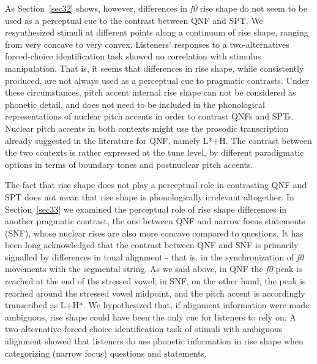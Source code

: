 As Section~\ref{sec32} shows, however, differences in \textit{f0} rise shape do not seem to be used as a perceptual cue to the contrast between QNF and SPT. We resynthesized stimuli at different points along a continuum of rise shape, ranging from very concave to very convex. Listeners' responses to a two-alternatives forced-choice identification task showed no correlation with stimulus manipulation. That is, it seems that differences in rise shape, while consistently produced, are not always used as a perceptual cue to pragmatic contrasts. Under these circumstances, pitch accent internal rise shape can not be considered as phonetic detail, and does not need to be included in the phonological representations of nuclear pitch accents in order to contrast QNFs and SPTs. Nuclear pitch accents in both contexts might use the prosodic transcription already suggested in the literature for QNF, namely L*+H. The contrast between the two contexts is rather expressed at the tune level, by different paradigmatic options in terms of boundary tones and postnuclear pitch accents.

The fact that rise shape does not play a perceptual role in contrasting QNF and SPT does not mean that rise shape is phonologically irrelevant altogether. In Section~\ref{sec33} we examined the perceptual role of rise shape differences in another pragmatic contrast, the one between QNF and narrow focus statements (SNF), whose nuclear rises are also more concave compared to questions. It has been long acknowledged that the contrast between QNF and SNF is primarily signalled by differences in tonal alignment - that is, in the synchronization of \textit{f0} movements with the segmental string. As we said above, in QNF the \textit{f0} peak is reached at the end of the stressed vowel; in SNF, on the other hand, the peak is reached around the stressed vowel midpoint, and the pitch accent is accordingly transcribed as L+H*. We hypothesized that, if alignment information were made ambiguous, rise shape could have been the only cue for listeners to rely on. A two-alternative forced choice identification task of stimuli with ambiguous alignment showed that listeners do use phonetic information in rise shape when categorizing (narrow focus) questions and statements.

